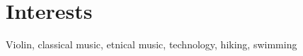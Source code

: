 \documentclass[letterpaper]{twentysecondcv}
\begin{document}



\section{Interests}

Violin, classical music, etnical music, technology, hiking, swimming

\cvprivacy
\end{document}
